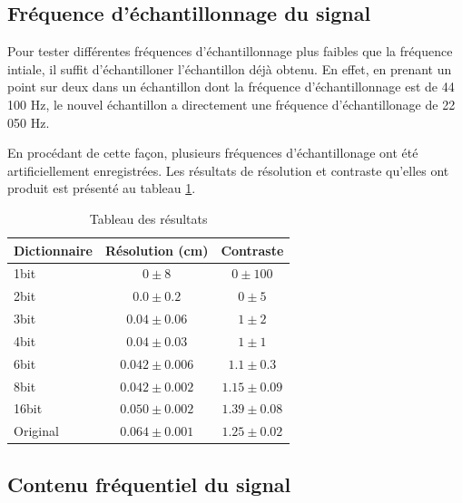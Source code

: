 \documentclass[11pt,letterpaper]{article}
\begin{document}
\subsection{Fréquence d'échantillonnage du signal}

Pour tester différentes fréquences d'échantillonnage plus faibles que la 
fréquence intiale, il suffit d'échantilloner l'échantillon déjà obtenu. En
effet, en prenant un point sur deux dans un échantillon dont la fréquence
d'échantillonnage est de 44 100 Hz, le nouvel échantillon a directement une
fréquence d'échantillonage de 22 050 Hz. 

En procédant de cette façon, plusieurs fréquences d'échantillonage ont été
artificiellement enregistrées. Les résultats de résolution et contraste 
qu'elles ont produit est présenté au tableau \ref{fs}.

\begin{table}[ht]
    \centering
    \begin{tabular}{l c c}
    \hline
    Dictionnaire & Résolution (cm) & Contraste  \\ \hline
    1bit & $0 \pm 8$ & $0 \pm 100$ \\
    2bit & $0.0 \pm 0.2$ & $0 \pm 5$ \\
    3bit & $0.04 \pm 0.06$ & $1 \pm 2$ \\
    4bit & $0.04 \pm 0.03$ & $1 \pm 1$ \\
    6bit & $0.042 \pm 0.006$ & $1.1 \pm 0.3$ \\
    8bit & $0.042 \pm 0.002$ & $1.15 \pm 0.09$ \\
    16bit & $0.050 \pm 0.002$ & $1.39 \pm 0.08$ \\
    Original & $0.064 \pm 0.001$ & $1.25 \pm 0.02$ \\
    \hline
    \end{tabular}
    \caption{Tableau des résultats }
    \label{fs}
  \end{table}

\subsection{Contenu fréquentiel du signal}
\end{document}
